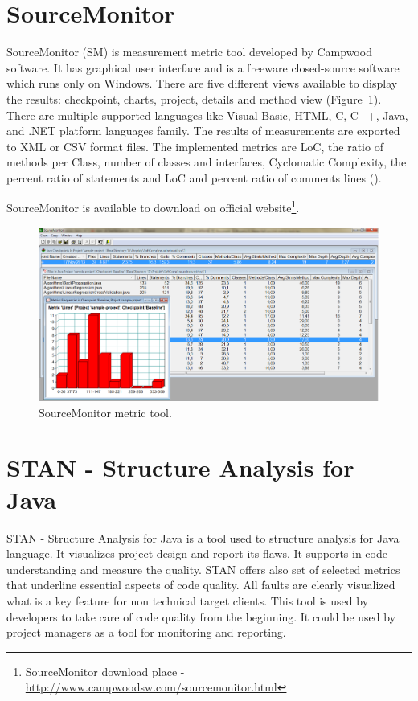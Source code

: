 \section{SourceMonitor}
SourceMonitor (SM) is measurement metric tool developed by Campwood software. It has graphical user interface and is a freeware closed-source software which runs only on Windows. There are five different views available to display the results: checkpoint, charts, project, details and method view (Figure~\ref{fig:sourcemonitor}). There are multiple supported languages like Visual Basic, HTML, C, C++, Java, and .NET platform languages family. The results of measurements are exported to XML or CSV format files. The implemented metrics are \ac{LoC}, the ratio of methods per Class, number of classes and interfaces, Cyclomatic Complexity, the percent ratio of statements and \ac{LoC} and percent ratio of comments lines (\cite{indie}).

SourceMonitor is available to download on official website\footnote{SourceMonitor download place - \url{http://www.campwoodsw.com/sourcemonitor.html}}.

\begin{figure}[h!]
	\centering
	\includegraphics[scale=0.4]{img/sourcemonitor.png} 
	\caption{SourceMonitor metric tool.}		
	\label{fig:sourcemonitor}
\end{figure}

\section{STAN - Structure Analysis for Java} 
STAN - Structure Analysis for Java is a tool used to structure analysis for Java language. It visualizes project design and report its flaws. It supports in code understanding and measure the quality. STAN offers also set of selected metrics that underline essential aspects of code quality. All faults are clearly visualized what is a key feature for non technical target clients. This tool is used by developers to take care of code quality from the beginning. It could be used by project managers as a tool for monitoring and reporting. 

